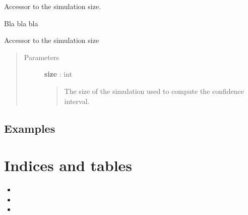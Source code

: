 \documentclass[letterpaper,10pt,english]{sphinxmanual}
\begin{document}
\begin{fulllineitems}
\begin{fulllineitems}
\end{fulllineitems}


\begin{fulllineitems}
\label{_generated/otpod.UnivariateLinearModelPOD:otpod.UnivariateLinearModelPOD.getSimulationSize}
Accessor to the simulation size.

\end{fulllineitems}


\begin{fulllineitems}
\label{_generated/otpod.UnivariateLinearModelPOD:otpod.UnivariateLinearModelPOD.run}
Bla bla bla

\end{fulllineitems}


\begin{fulllineitems}
\label{_generated/otpod.UnivariateLinearModelPOD:otpod.UnivariateLinearModelPOD.setSimulationSize}
Accessor to the simulation size
\begin{quote}\begin{description}
\item[{Parameters}] \leavevmode
\textbf{size} : int
\begin{quote}

The size of the simulation used to compute the confidence interval.
\end{quote}

\end{description}\end{quote}

\end{fulllineitems}


\end{fulllineitems}



\section{Examples}
\label{examples::doc}\label{examples:examples}

\chapter{Indices and tables}
\label{index:indices-and-tables}\begin{itemize}
\item {} 

\item {} 

\item {} 

\end{itemize}



\renewcommand{\indexname}{Index}
\printindex
\end{document}
